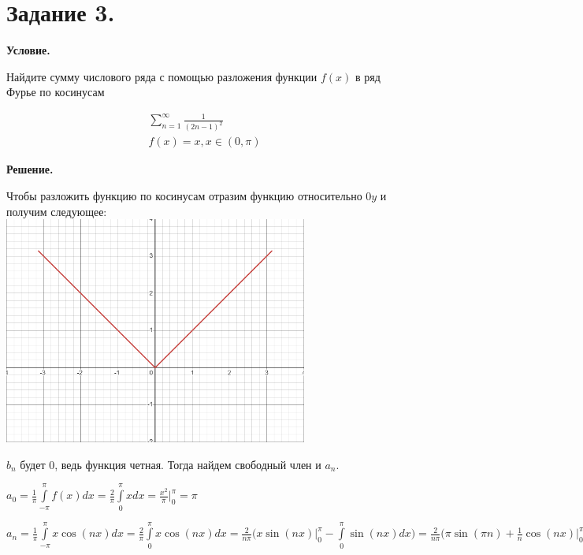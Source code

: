 \section{Задание 3.}

\textbf{Условие.}

Найдите сумму числового ряда с помощью разложения функции $f(x)$ в ряд Фурье по косинусам

\begin{gather*}
    \sum_{n = 1}^\infty \frac{1}{(2n - 1)^2} \\
    f(x) = x, x \in (0, \pi)
\end{gather*}

\vspace{10mm}

\textbf{Решение.}

Чтобы разложить функцию по косинусам отразим функцию относительно $0y$ и получим следующее:\\

\includegraphics[width=10cm]{images/3-01}

$b_n$ будет 0, ведь функция четная. Тогда найдем свободный член и $a_n$.

{$\displaystyle a_0 = \frac{1}{\pi}\int\limits_{-\pi}^{\pi} f(x) dx = \frac{2}{\pi}\int\limits_{0}^{\pi} x dx =
\frac{x^2}{\pi}\Big|_{0}^{\pi} = \pi$}

{$\displaystyle a_n = \frac{1}{\pi}\int\limits_{-\pi}^{\pi}x \cos(nx)dx = \frac{2}{\pi}\int\limits_{0}^{\pi}x \cos(nx)dx =
\frac{2}{n\pi}\bigl( x\sin(nx) \Big|_{0}^{\pi}- \int\limits_{0}^{\pi}\sin(nx)dx\bigr) =
\frac{2}{n\pi}\bigl(\pi\sin(\pi n) + \frac{1}{n}\cos( nx)\Big|_{0}^{\pi}\bigr) =
\frac{2}{n\pi}\bigl(\pi\sin(\pi n) + \frac{1}{n}\cos(\pi n) - \frac{1}{n}) =
\frac{2(\pi n \sin(n\pi) + \cos(n\pi) - 1)}{\pi n^2}$}\\

